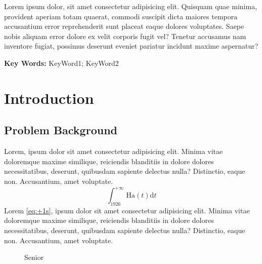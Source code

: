 \documentclass[UTF8]{mcmthesis}
\begin{document}
\begin{summary}
        Lorem ipsum dolor, sit amet consectetur adipisicing elit. Quisquam quae minima, provident aperiam totam quaerat, commodi suscipit dicta maiores tempora accusantium error reprehenderit sunt placeat eaque dolores voluptates. Saepe nobis aliquam error dolore ex velit corporis fugit vel? Tenetur accusamus nam inventore fugiat, possimus deserunt eveniet pariatur incidunt maxime aspernatur?

        \vspace{2em}
        \noindent\textbf{Key Words: } KeyWord1; KeyWord2
    \end{summary}

    \maketitle
    \newpage
    \tableofcontents

    \newpage
    \setcounter{page}{1}
    \section{Introduction}
        \subsection{Problem Background}
            \hspace*{2em}Lorem, ipsum dolor sit amet consectetur adipisicing elit. Minima vitae doloremque maxime similique, reiciendis blanditiis in dolore dolores necessitatibus, deserunt, quibusdam sapiente delectus nulla? Distinctio, eaque non. Accusantium, amet voluptate. \cite{link}
            \begin{equation}
                \int_{1926}^{+\infty} \text{Ha}(t)\mathrm{d}t
                \label{eq:+1s}    
            \end{equation}
            Lorem \eqref{eq:+1s}, ipsum dolor sit amet consectetur adipisicing elit. Minima vitae doloremque maxime similique, reiciendis blanditiis in dolore dolores necessitatibus, deserunt, quibusdam sapiente delectus nulla? Distinctio, eaque non. Accusantium, amet voluptate. 
            \begin{figure}[htpb]
                \centering
                \vspace{-.5em}
                \caption{Senior}
                \label{fig:1}
            \end{figure}
            
\end{document}
